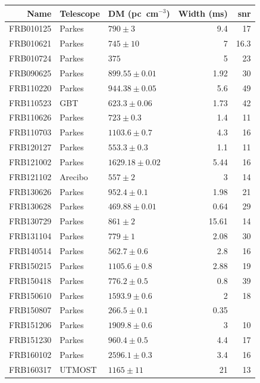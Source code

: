 \documentclass[a4paper,fleqn,usenatbib]{mnras}
\begin{document}
\begin{table}
\centering
\begin{tabular}{ r l l r r }
Name      & Telescope & DM (pc~cm$^{-3}$)& Width (ms) & \gls{snr}  \\
\hline
FRB010125 & Parkes  & $790 \pm 3$        &  9.4 	&	17   \\ 
FRB010621 & Parkes  & $745 \pm 10$       &  7		&	16.3 \\
FRB010724 & Parkes  & $375$              &  5		&	23   \\ 
FRB090625 & Parkes  & $899.55 \pm 0.01$  &  1.92	&	30   \\ 
FRB110220 & Parkes  & $944.38 \pm 0.05$  &  5.6		&	49   \\ 
FRB110523 & GBT     & $623.3 \pm 0.06$   &  1.73	&	42   \\ 
FRB110626 & Parkes  & $723 \pm 0.3$      &  1.4		&	11   \\ 
FRB110703 & Parkes  & $1103.6 \pm 0.7$   &  4.3		&	16   \\ 
FRB120127 & Parkes  & $553.3 \pm 0.3$    &  1.1		&	11   \\ 
FRB121002 & Parkes  & $1629.18 \pm 0.02$ &  5.44	&	16   \\ 
FRB121102 & Arecibo & $557 \pm 2$        &  3		&	14   \\ 
FRB130626 & Parkes  & $952.4 \pm 0.1$    &  1.98	&	21   \\ 
FRB130628 & Parkes  & $469.88 \pm 0.01$  &  0.64	&	29   \\ 
FRB130729 & Parkes  & $861 \pm 2$        &  15.61	&	14   \\ 
FRB131104 & Parkes  & $779 \pm 1$        &  2.08	&	30   \\ 
FRB140514 & Parkes  & $562.7 \pm 0.6$    &  2.8		&	16   \\ 
FRB150215 & Parkes  & $1105.6 \pm 0.8$   &  2.88	&	19   \\ 
FRB150418 & Parkes  & $776.2 \pm 0.5$    &  0.8		&	39   \\ 
FRB150610 & Parkes  & $1593.9 \pm 0.6$   &  2		&	18   \\ 
FRB150807 & Parkes  & $266.5 \pm 0.1$    &  0.35	&	     \\ 
FRB151206 & Parkes  & $1909.8 \pm 0.6$   &  3		&	10   \\ 
FRB151230 & Parkes  & $960.4 \pm 0.5$    &  4.4		&	17   \\ 
FRB160102 & Parkes  & $2596.1 \pm 0.3$   &  3.4		&	16   \\ 
FRB160317 & UTMOST  & $1165 \pm 11$      &  21		&	13   \\ 

\end{tabular}
\end{table}
\end{document}

